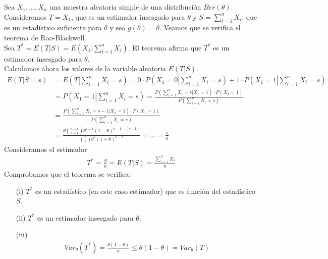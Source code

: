 \begin{ejemplo}
Sea $X_1,...,X_n$ una muestra aleatoria simple de una distribución $Ber(\theta)$. Consideremos $T = X_1$, que es un estimador insesgado para $\theta$ y $S = \sum_{i=1}^{n}{X_i}$, que es un estadístico suficiente para $\theta$ y sea $g(\theta) = \theta$. Veamos que se verifica el teorema de Rao-Blackwell.
\\
\newline
Sea $T^* = E(T | S) = E\left(X_1 | \sum_{i=1}^{n}{X_i}\right)$. El teorema afirma que $T^*$ es un estimador insesgado para $\theta$.
\\
\newline
Calculamos ahora los valores de la variable aleatoria $E(T | S)$.
\begin{align*}
    E\left(T | S = s \right) &= E\left(T \left|  \sum_{i=1}^{n}{X_i} = s \right.\right) 
    = 0 \cdot P\left(X_1 = 0 \left|  \sum_{i=1}^{n}{X_i} = s \right.\right) + 1 \cdot P\left(X_1 = 1 \left|  \sum_{i=1}^{n}{X_i} = s \right.\right) \\
    &= P\left(X_1 = 1 \left|  \sum_{i=1}^{n}{X_i} = s \right.\right) = \frac{P\left(\sum_{i=1}^{n}{X_i} = s  \left|  X_1 = 1 \right.\right) \cdot P(X_1 = 1)}{P\left(\sum_{i=1}^{n}{X_i} = s\right)} \\
    &= \frac{P\left(\sum_{i=2}^{n}{X_i} = s - 1  \left|  X_1 = 1 \right.\right) \cdot P(X_1 = 1)}{P\left(\sum_{i=1}^{n}{X_i} = s\right)} \\
    &= \frac{\theta \binom{n-1}{s-1}\theta^{s-1}(1 - \theta)^{n-1-(s-1)}}{\binom{n}{s}\theta^s(1-\theta)^{n-s}} = ... = \frac{s}{n}
\end{align*}
Consideramos el estimador
\begin{align*}
    T^* = \frac{S}{n} = E(T | S) = \frac{\sum_{i=1}^{n}{X_i}}{n}
\end{align*}
Comprobamos que el teorema se verifica:
\begin{enumerate}
    \item[(i)] $T^*$ es un estadístico (en este caso estimador) que es función del estadístico $S$.
    \item[(ii)] $T^*$ es un estimador insesgado para $\theta$.
    \item[(iii)]
    \begin{align*}
        Var_{\theta}(T^*) = \frac{\theta (1 - \theta)}{n} \leq \theta (1 - \theta) = Var_{\theta}(T)
    \end{align*}
\end{enumerate}
\end{ejemplo}

